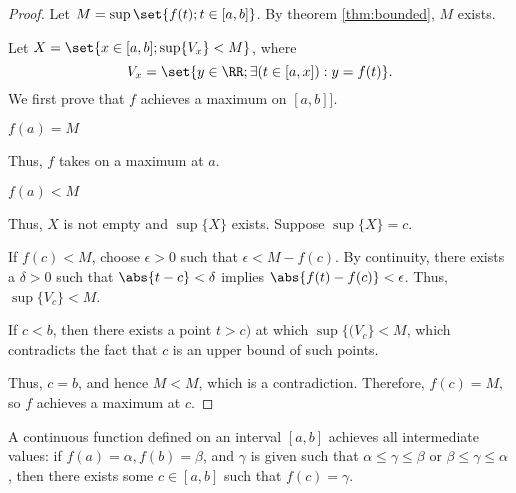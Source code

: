 \documentclass[11pt]{scrartcl}
\begin{document}
\begin{proof}
  Let \(M=\sup \set{f(t); t\in[a,b]}\). By theorem \ref{thm:bounded},
  \(M\) exists. \vv

  Let \(X=\set{x\in[a,b];\sup\{V_{x}\} < M}\), where
  \[V_{x}=\set{y\in\RR ; \exists (t\in[a,x]):y = f(t)}.\]
  We first prove that \(f\) achieves a maximum on \([a,b]\)].
  \begin{case*}[\textbf{1}]
    \(f(a) = M\)
  \end{case*}
  Thus, \(f\) takes on a maximum at \(a\).
  \begin{case*}[2]
    \(f(a)< M\)
  \end{case*}
  Thus, \(X\) is not empty and \(\sup\{X\}\) exists. Suppose  \(\sup\{X\}=c\). \vv

  If \(f(c)<M\), choose \(\epsilon >0\) such that \(\epsilon < M-f(c)\). By continuity,
  there exists a \(\delta>0\) such that \(\abs{t-c}<\delta\) implies
  \(\abs{f(t)-f(c)}<\epsilon\). Thus, \(\sup\{V_{c}\}<M\). \vv

  If \(c<b\), then there exists a point \(t>c)\) at which
  \(\sup\{(V_{c}\} < M\), which contradicts the fact that \(c\) is an
  upper bound of such points. \vv

  Thus, \(c=b\), and hence \(M<M\), which is a
  contradiction. Therefore, \(f(c) = M\), so \(f\) achieves a maximum
  at \(c\).

  

  
\end{proof}
\begin{theorem}
  A continuous function defined on an interval \([a,b]\) achieves all
  intermediate values: if \(f(a)=\alpha, f(b)=\beta \), and \(\gamma\)
  is given such that \(\alpha \leq \gamma \leq \beta\) or
  \(\beta \leq \gamma \leq \alpha\) , then there exists some
  \(c\in[a,b]\) such that \(f(c) = \gamma\).
\end{theorem}
\end{document}
